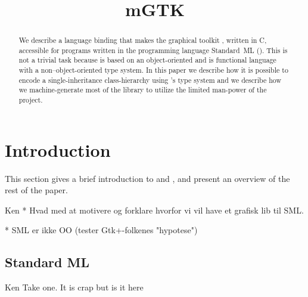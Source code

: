 \documentclass[workingdraft,endnotes]{usetex-v1}
\begin{document}
\title{mGTK}


\author{
\and
{}
%
} %

\maketitle

\begin{abstract}
  We describe \mgtk a language binding that makes the graphical
  toolkit \gtk, written in C, accessible for programs written in the
  programming language Standard~ML (\sml).  This is not a trivial task
  because \gtk is based on an object-oriented and \sml is functional
  language with a non--object-oriented type system.  In this paper we
  describe how it is possible to encode a single-inheritance
  class-hierarchy using \sml's type system and we describe how we
  machine-generate most of the library to utilize the limited
  man-power of the project.
\end{abstract}



\section{Introduction}
\label{sec:intr-backgr}

This section gives a brief introduction to \sml and \gtk, and present
an overview of the rest of the paper.

\begin{ednote}{Ken}
  * Hvad med at motivere og forklare hvorfor vi vil have et grafisk lib
  til SML.

  * SML er ikke OO (tester Gtk+-folkenes "hypotese")
\end{ednote}

\subsection{Standard ML}

\begin{ednote}{Ken}
  Take one.  It is crap but is it here
\end{ednote}
\end{document}
